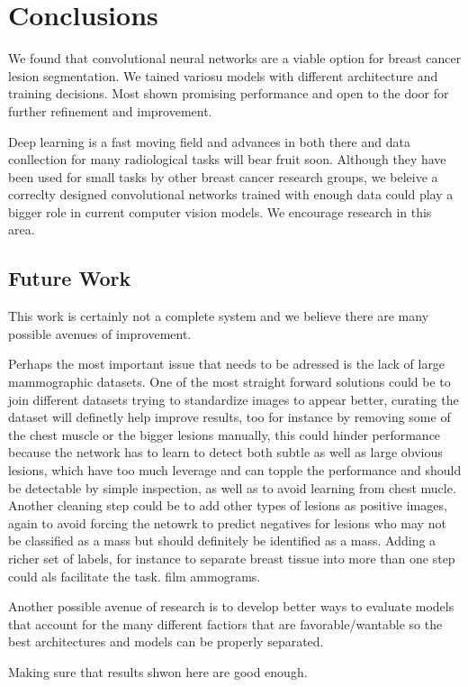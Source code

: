 \chapter{Conclusions}
\label{ch:Conclusions}
We found that convolutional neural networks are a viable option for breast cancer lesion segmentation. 
We tained variosu models with different architecture and training decisions. Most shown promising performance and open to the door for further refinement and improvement.

Deep learning is a fast moving field and advances in both there and data conllection for many radiological tasks will bear fruit soon.
Although they have been used for small tasks by other breast cancer research groups, we beleive a correclty designed convolutional networks trained with enough data could play a bigger role in current computer vision models. We encourage research in this area. 

\section{Future Work}
This work is certainly not a complete system and we believe there are many possible avenues of improvement. 

Perhaps the most important issue that needs to be adressed is the lack of large mammographic datasets. One of the most straight forward solutions could be to join different datasets trying to standardize images to appear better, curating the dataset will definetly help improve results, too for instance by removing some of the chest muscle or the bigger lesions manually, this could hinder performance because the network has to learn to detect both subtle as well as large obvious lesions, which have too much leverage and can topple the performance and should be detectable by simple inspection, as well as to avoid learning from chest mucle. Another cleaning step could be to add other types of lesions as positive images, again to avoid forcing the netowrk to predict negatives for lesions who may not be classified as a mass but should definitely be identified as a mass. Adding a richer set of labels, for instance to separate breast tissue into more than one step could als facilitate the task. film ammograms.

Another possible avenue of research is to develop better ways to evaluate models that account for the many different factiors that are favorable/wantable so the best architectures and models can be properly separated.

Making sure that results shwon here are good enough.

